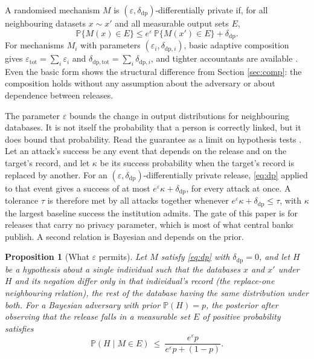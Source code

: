 \documentclass[11pt,a4paper]{article}
\theoremstyle{plain}
\newtheorem{proposition}{Proposition}
\theoremstyle{definition}
\theoremstyle{definition}
\theoremstyle{plain}
\newcommand{\Prob}{\mathbb{P}}
\begin{document}
A randomised mechanism $M$ is $(\varepsilon, \delta_{\mathrm{dp}})$-differentially
private if, for all neighbouring datasets $x \sim x'$ and all measurable output
sets $E$,
\begin{equation}
\Prob\{M(x) \in E\} \leq e^{\varepsilon}\,\Prob\{M(x') \in E\}
+ \delta_{\mathrm{dp}} .
\label{eq:dp}
\end{equation}
For mechanisms $M_i$ with parameters $(\varepsilon_i, \delta_{\mathrm{dp},i})$,
basic adaptive composition gives $\varepsilon_{\mathrm{tot}} = \sum_i
\varepsilon_i$ and $\delta_{\mathrm{dp,tot}} = \sum_i \delta_{\mathrm{dp},i}$, and tighter accountants are
available \citep{dwork2010,kairouz2017,bun2016,mironov2017,dong2022}. Even the basic form shows the
structural difference from Section \ref{sec:comp}: the composition holds without
any assumption about the adversary or about dependence between releases.

The parameter $\varepsilon$ bounds the change in output distributions for
neighbouring databases. It is not itself the probability that a person is
correctly linked, but it does bound that probability. Read the guarantee as a
limit on hypothesis tests \citep{wasserman2010,kairouz2017,dong2022}. Let an
attack's success be any event that depends on the release and on the target's
record, and let $\kappa$ be its success probability when the target's record is
replaced by another. For an $(\varepsilon,\delta_{\mathrm{dp}})$-differentially
private release, \eqref{eq:dp} applied to that event gives a success of at most
$e^{\varepsilon}\kappa + \delta_{\mathrm{dp}}$, for every attack at once. A
tolerance $\tau$ is therefore met by all attacks together whenever
$e^{\varepsilon}\kappa + \delta_{\mathrm{dp}} \leq \tau$, with $\kappa$ the
largest baseline success the institution admits. The gate of this paper is for
releases that carry no privacy parameter, which is most of what central banks
publish. A second relation is Bayesian and depends on the prior.

\begin{proposition}[What $\varepsilon$ permits]\label{prop:dpbound}
Let $M$ satisfy \eqref{eq:dp} with $\delta_{\mathrm{dp}} = 0$, and let $H$ be a
hypothesis about a single individual such that the databases $x$ and $x'$ under
$H$ and its negation differ only in that individual's record (the replace-one
neighbouring relation), the rest of the database having the same distribution
under both.
For a Bayesian adversary with prior $\Prob(H) = p$, the posterior after
observing that the release falls in a measurable set $E$ of positive
probability satisfies
\begin{equation}
\Prob(H \mid M \in E) \ \leq \
\frac{e^{\varepsilon} p}{e^{\varepsilon} p + (1 - p)} .
\label{eq:dppost}
\end{equation}
\end{proposition}
\end{document}
